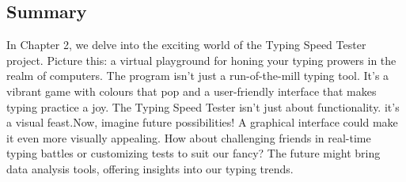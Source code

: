 \vspace{4mm}



\vspace{5mm}



\subsection{Summary}
In Chapter 2, we delve into the exciting world of the Typing Speed Tester project. Picture this: a virtual playground for honing your typing prowers in the realm of computers. The program isn't just a run-of-the-mill typing tool. It's a vibrant game with colours that pop and a user-friendly interface that makes typing practice a joy. The Typing Speed Tester isn't just about functionality. it's a visual feast.Now, imagine future possibilities! A graphical interface could make it even more visually appealing. How about challenging friends in real-time typing battles or customizing tests to suit our fancy? The future might bring data analysis tools, offering insights into our typing trends.
